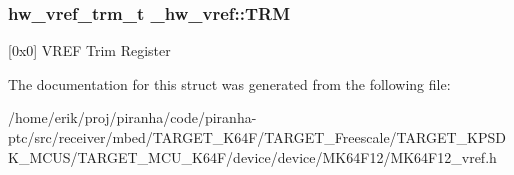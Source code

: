 \subsubsection[{\texorpdfstring{T\+RM}{TRM}}]{ {\bf hw\+\_\+vref\+\_\+trm\+\_\+t} \+\_\+hw\+\_\+vref\+::\+T\+RM}\hypertarget{struct__hw__vref_a3345e06c59161eeb37a8f3e0de5e17b2}{}\label{struct__hw__vref_a3345e06c59161eeb37a8f3e0de5e17b2}
\mbox{[}0x0\mbox{]} V\+R\+EF Trim Register 

The documentation for this struct was generated from the following file\+:\begin{DoxyCompactItemize}
\item 
/home/erik/proj/piranha/code/piranha-\/ptc/src/receiver/mbed/\+T\+A\+R\+G\+E\+T\+\_\+\+K64\+F/\+T\+A\+R\+G\+E\+T\+\_\+\+Freescale/\+T\+A\+R\+G\+E\+T\+\_\+\+K\+P\+S\+D\+K\+\_\+\+M\+C\+U\+S/\+T\+A\+R\+G\+E\+T\+\_\+\+M\+C\+U\+\_\+\+K64\+F/device/device/\+M\+K64\+F12/M\+K64\+F12\+\_\+vref.\+h\end{DoxyCompactItemize}
